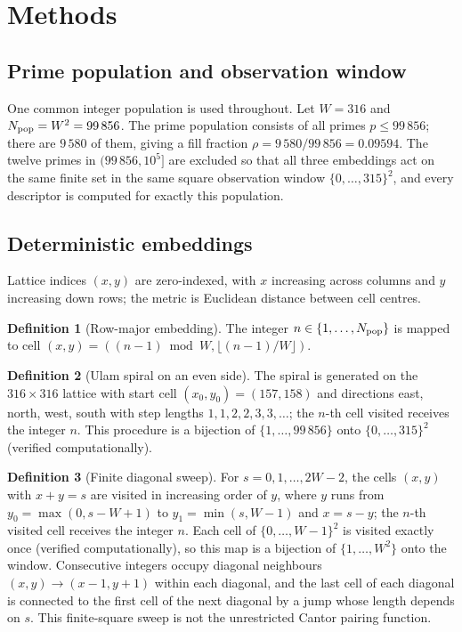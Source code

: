 \documentclass[final,1p,times,authoryear]{elsarticle}
\theoremstyle{definition}
\newtheorem{definition}{Definition}[section]
\begin{document}
\section{Methods}

\subsection{Prime population and observation window}

One common integer population is used throughout. Let $W=316$ and
$N_{\rm pop}=W^2=99\,856$. The prime population consists of all primes
$p\le 99\,856$; there are $9\,580$ of them, giving a fill fraction
$\rho=9\,580/99\,856=0.09594$. The twelve primes in $(99\,856,10^5]$ are
excluded so that all three embeddings act on the same finite set in the same
square observation window $\{0,\dots,315\}^2$, and every descriptor is computed
for exactly this population.

\subsection{Deterministic embeddings}

Lattice indices $(x,y)$ are zero-indexed, with $x$ increasing across columns
and $y$ increasing down rows; the metric is Euclidean distance between cell
centres.

\begin{definition}[Row-major embedding]
The integer $n\in\{1,\dots,N_{\rm pop}\}$ is mapped to cell
$(x,y)=((n-1)\bmod W,\lfloor(n-1)/W\rfloor)$.
\end{definition}

\begin{definition}[Ulam spiral on an even side]
The spiral is generated on the $316\times316$ lattice with start cell
$(x_0,y_0)=(157,158)$ and directions east, north, west, south with step
lengths $1,1,2,2,3,3,\dots$; the $n$-th cell visited receives the integer $n$.
This procedure is a bijection of $\{1,\dots,99\,856\}$ onto
$\{0,\dots,315\}^2$ (verified computationally).
\end{definition}

\begin{definition}[Finite diagonal sweep]
For $s=0,1,\dots,2W-2$, the cells $(x,y)$ with $x+y=s$ are visited in
increasing order of $y$, where $y$ runs from $y_0=\max(0,s-W+1)$ to
$y_1=\min(s,W-1)$ and $x=s-y$; the $n$-th visited cell receives the integer
$n$. Each cell of $\{0,\dots,W-1\}^2$ is visited exactly once (verified
computationally), so this map is a bijection of $\{1,\dots,W^2\}$ onto the
window. Consecutive integers occupy diagonal neighbours $(x,y)\to(x-1,y+1)$
within each diagonal, and the last cell of each diagonal is connected to the
first cell of the next diagonal by a jump whose length depends on $s$. This
finite-square sweep is not the unrestricted Cantor pairing function.
\end{definition}
\end{document}
